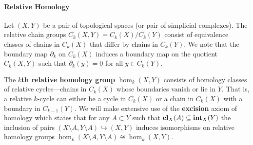 \paragraph{Relative Homology}

Let $(X, Y)$ be a pair of topological spaces (or pair of simplicial complexes).
The relative chain groups $C_k(X, Y) = C_k(X) / C_k(Y)$ consist of equivalence classes of chains in $C_k(X)$ that differ by chains in $C_k(Y)$.
We note that the boundary map $\partial_k$ on $C_k(X)$ induces a boundary map on the quotient $C_k(X, Y)$ such that $\partial_k(y) = 0$ for all $y\in C_k(Y)$.

The \textbf{$k$th relative homology group} $\hom_k(X, Y)$ consists of homology classes of relative cycles---chains in $C_k(X)$ whose boundaries vanish or lie in $Y$.
That is, a relative $k$-cycle can either be a cycle in $C_k(X)$ or a chain in $C_k(X)$ with a boundary in $C_{k-1}(Y)$.
We will make extensive use of the \textbf{excision} axiom of homology which states that for any $A\subset Y$ such that $\mathbf{cl}_X(A)\subseteq \mathbf{int}_X(Y)$ the inclusion of pairs $(X\setminus A, Y\setminus A)\hookrightarrow (X, Y)$ induces isomorphisms on relative homology groups $\hom_k(X\setminus A, Y\setminus A)\cong\hom_k(X, Y)$.
